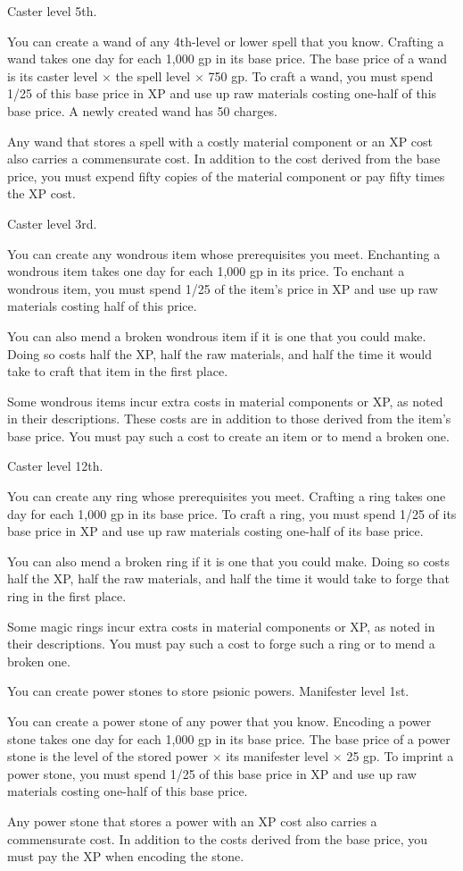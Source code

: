 {Caster level 5th.}
{You can create a wand of any 4th-level or lower spell that you know. Crafting a wand takes one day for each 1,000 gp in its base price. The base price of a wand is its caster level $\times$ the spell level $\times$ 750 gp. To craft a wand, you must spend 1/25 of this base price in XP and use up raw materials costing one-half of this base price. A newly created wand has 50 charges.

Any wand that stores a spell with a costly material component or an XP cost also carries a commensurate cost. In addition to the cost derived from the base price, you must expend fifty copies of the material component or pay fifty times the XP cost.}

{Caster level 3rd.}
{You can create any wondrous item whose prerequisites you meet. Enchanting a wondrous item takes one day for each 1,000 gp in its price. To enchant a wondrous item, you must spend 1/25 of the item’s price in XP and use up raw materials costing half of this price.

You can also mend a broken wondrous item if it is one that you could make. Doing so costs half the XP, half the raw materials, and half the time it would take to craft that item in the first place.

Some wondrous items incur extra costs in material components or XP, as noted in their descriptions. These costs are in addition to those derived from the item’s base price. You must pay such a cost to create an item or to mend a broken one.}

{Caster level 12th.}
{You can create any ring whose prerequisites you meet. Crafting a ring takes one day for each 1,000 gp in its base price. To craft a ring, you must spend 1/25 of its base price in XP and use up raw materials costing one-half of its base price.

You can also mend a broken ring if it is one that you could make. Doing so costs half the XP, half the raw materials, and half the time it would take to forge that ring in the first place.

Some magic rings incur extra costs in material components or XP, as noted in their descriptions. You must pay such a cost to forge such a ring or to mend a broken one.}

{You can create power stones to store psionic powers.}
{Manifester level 1st.}
{You can create a power stone of any power that you know. Encoding a power stone takes one day for each 1,000 gp in its base price. The base price of a power stone is the level of the stored power $\times$ its manifester level $\times$ 25 gp. To imprint a power stone, you must spend 1/25 of this base price in XP and use up raw materials costing one-half of this base price.

Any power stone that stores a power with an XP cost also carries a commensurate cost. In addition to the costs derived from the base price, you must pay the XP when encoding the stone.}{}{}

